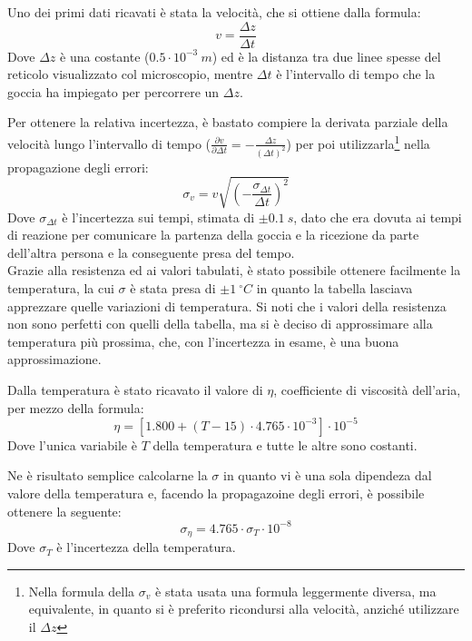 \documentclass{article}
\begin{document}
Uno dei primi dati ricavati è stata la velocità, che si ottiene dalla formula:
\begin{equation}
	v=\frac{\Delta z}{\Delta t}
	\label{velocita_limite}
\end{equation}
Dove $\Delta z$ è una costante ($0.5\cdot10^{-3}\ m$) ed è la distanza tra due linee spesse del reticolo visualizzato col microscopio, mentre $\Delta t$ è l'intervallo di tempo che la goccia ha impiegato per percorrere un $\Delta z$.

Per ottenere la relativa incertezza, è bastato compiere la derivata parziale della velocità lungo l'intervallo di tempo ($\frac{\partial v}{\partial \Delta t}=-\frac{\Delta z}{(\Delta t)^2}$) per poi utilizzarla\footnote{Nella formula della $\sigma_v$ è stata usata una formula leggermente diversa, ma equivalente, in quanto si è preferito ricondursi alla velocità, anziché utilizzare il $\Delta z$} nella propagazione degli errori:
\begin{equation}
	\sigma_v=v\sqrt{\left(-\frac{\sigma_{\Delta t}}{\Delta t}\right)^2}
	\label{sigma_v}
\end{equation}
Dove $\sigma_{\Delta t}$ è l'incertezza sui tempi, stimata di $\pm0.1\ s$, dato che era dovuta ai tempi di reazione per comunicare la partenza della goccia e la ricezione da parte dell'altra persona e la conseguente presa del tempo.\\

Grazie alla resistenza ed ai valori tabulati, è stato possibile ottenere facilmente la temperatura, la cui $\sigma$ è stata presa di $\pm1\ ^\circ C$ in quanto la tabella lasciava apprezzare quelle variazioni di temperatura. Si noti che i valori della resistenza non sono perfetti con quelli della tabella, ma si è deciso di approssimare alla temperatura più prossima, che, con l'incertezza in esame, è una buona approssimazione.

Dalla temperatura è stato ricavato il valore di $\eta$, coefficiente di viscosità dell'aria, per mezzo della formula:
\begin{equation}
	\eta=[1.800+(T-15)\cdot 4.765\cdot 10^{-3}]\cdot 10^{-5}
	\label{eta}
\end{equation}
Dove l'unica variabile è $T$ della temperatura e tutte le altre sono costanti.

Ne è risultato semplice calcolarne la $\sigma$ in quanto vi è una sola dipendeza dal valore della temperatura e, facendo la propagazoine degli errori, è possibile ottenere la seguente:
\begin{equation}
	\sigma_{\eta}=4.765\cdot\sigma_T\cdot 10^{-8}
	\label{sigma_eta}
\end{equation}
Dove $\sigma_T$ è l'incertezza della temperatura.\\
\end{document}
